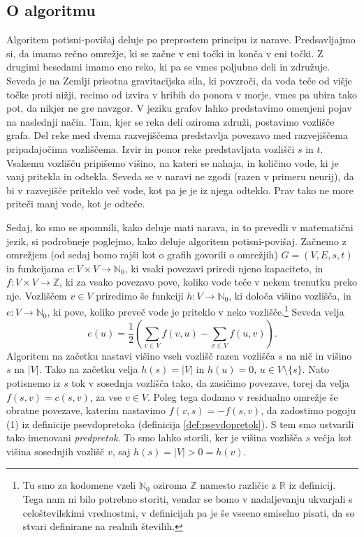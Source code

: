\documentclass[mat1]{fmfdelo}
\newcommand{\R}{\mathbb R}
\newcommand{\N}{\mathbb N}
\newcommand{\Z}{\mathbb Z}
\begin{document}
\subsection{O algoritmu}
Algoritem potisni-povišaj deluje po preprostem principu iz narave. Predsavljajmo si, da imamo rečno omrežje, ki se začne v eni točki in konča v eni točki. Z drugimi besedami imamo eno reko, ki pa se vmes poljubno deli in združuje. Seveda je na Zemlji prisotna gravitacijska sila, ki povzroči, da voda teče od višje točke proti nižji, recimo od izvira v hribih do ponora v morje, vmes pa ubira tako pot, da nikjer ne gre navzgor. V jeziku grafov lahko predstavimo omenjeni pojav na naslednji način. Tam, kjer se reka deli oziroma združi, postavimo vozlišče grafa. Del reke med dvema razvejiščema predstavlja povezavo med razvejiščema pripadajočima vozliščema. Izvir in ponor reke predstavljata vozlišči $s$ in $t$. Vsakemu vozlišču pripišemo višino, na kateri se nahaja, in količino vode, ki je vanj pritekla in odtekla. Seveda se v naravi ne zgodi (razen v primeru neurij), da bi v razvejišče priteklo več vode, kot pa je je iz njega odteklo. Prav tako ne more priteči manj vode, kot je odteče.

Sedaj, ko smo se spomnili, kako deluje mati narava, in to prevedli v matematični jezik, si podrobneje poglejmo, kako deluje algoritem potisni-povišaj. Začnemo z omrežjem (od sedaj bomo rajši kot o grafih govorili o omrežjih) $G = (V, E, s, t)$ in funkcijama $c\colon V \times V \rightarrow \N_0$, ki vsaki povezavi priredi njeno kapaciteto, in $f\colon V \times V \rightarrow \Z$, ki za vsako povezavo pove, koliko vode teče v nekem trenutku preko nje. Vozliščem $v \in V$ priredimo še funkciji $h\colon V \rightarrow \N_0$, ki določa višino vozlišča, in $e\colon V \rightarrow \N_0$, ki pove, koliko preveč vode je priteklo v neko vozlišče.\footnote{Tu smo za kodomene vzeli $\N_0$ oziroma $\Z$ namesto različic z $\R$ iz definicij. Tega nam ni bilo potrebno storiti, vendar se bomo v nadaljevanju ukvarjali s celoštevilskimi vrednostmi, v definicijah pa je še vseeno smiselno pisati, da so stvari definirane na realnih številih.} Seveda velja \[e(u) = \frac{1}{2}\left(\sum_{v \in V} f(v,u) - \sum_{v \in V} f(u,v)\right).\] Algoritem na začetku nastavi višino vseh vozlišč razen vozlišča $s$ na nič in višino $s$ na $|V|$. Tako na začetku velja $h(s) = |V|$ in $h(u) = 0$, $u \in V \setminus \{s\}$. Nato potisnemo iz $s$ tok v sosednja vozlišča tako, da zasičimo povezave, torej da velja $f(s, v) = c(s, v)$, za vse $v \in V$. Poleg tega dodamo v residualno omrežje še obratne povezave, katerim nastavimo $f(v,s) = -f(s,v)$, da zadostimo pogoju (1) iz definicije psevdopretoka (definicija \ref{def:psevdopretok}). S tem smo ustvarili tako imenovani \textit{predpretok}. To smo lahko storili, ker je višina vozlišča $s$ večja kot višina sosednjih vozlišč $v$, saj $h(s) = |V| > 0 = h(v)$.
\end{document}
